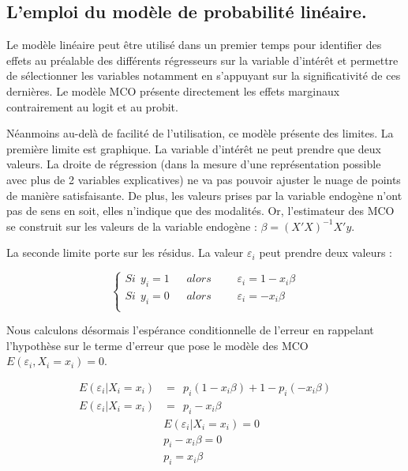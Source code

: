 

\subsection{L'emploi du modèle de probabilité linéaire.}

Le modèle linéaire peut être utilisé dans un premier temps pour identifier des effets au préalable des différents régresseurs sur la variable d’intérêt et permettre de sélectionner les variables notamment en s’appuyant sur la significativité de ces dernières. Le modèle MCO présente directement les effets marginaux contrairement au logit et au probit. 

\vspace*{0.3cm}

Néanmoins au-delà de facilité de l'utilisation, ce modèle présente des limites. La première limite est graphique. La variable d’intérêt ne peut prendre que deux valeurs. La droite de régression (dans la mesure d’une représentation possible avec plus de 2 variables explicatives) ne va pas pouvoir ajuster le nuage de points de manière satisfaisante. De plus, les valeurs prises par la variable endogène n’ont pas de sens en soit, elles n’indique que des modalités. Or, l’estimateur des MCO se construit sur les valeurs de la variable endogène : $\beta = (X'X)^{-1}X'y$. 

\vspace*{0.3cm}

La seconde limite porte sur les résidus. La valeur $\varepsilon_i$ peut prendre deux valeurs : 

 \begin{equation*}
	\left\lbrace
		\begin{aligned}
            Si \: \: y_i = 1  \:\:\:\:\:\:\: alors \:\:\:\:\:\:\: & \varepsilon_i = 1 - x_i\beta \\
            Si \: \:y_i = 0  \:\:\:\:\:\:\: alors \:\:\:\:\:\:\: & \varepsilon_i = -x_i\beta \\
		\end{aligned}
	\right.
\end{equation*}


 Nous calculons désormais l'espérance conditionnelle de l'erreur en rappelant l'hypothèse sur le terme d'erreur que pose le modèle des MCO $E(\varepsilon_i,X_i = x_i) =0$.

\begin{align*}
   E(\varepsilon_i | X_i = x_i) &= \: \: p_i (1 - x_i\beta) + 1- p_i (- x_i\beta) \\
   E(\varepsilon_i | X_i = x_i) &= \: \: p_i - x_i\beta \\ 
   &E(\varepsilon_i | X_i = x_i) = 0 \\
    &p_i - x_i\beta = 0 \\ 
    &p_i = x_i\beta 
\end{align*}

